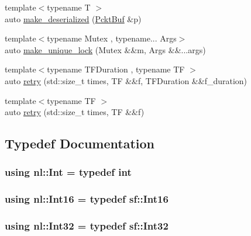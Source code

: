 \begin{DoxyCompactItemize}
\item 
{\footnotesize template$<$typename T $>$ }\\auto \hyperlink{namespacenl_ab637efa6cdc8acaf0cb94e7289636396}{make\+\_\+deserialized} (\hyperlink{namespacenl_a789b828a23e37a113433c2838e7c8e28}{Pckt\+Buf} \&p)
\item 
{\footnotesize template$<$typename Mutex , typename... Args$>$ }\\auto \hyperlink{namespacenl_a05d520ad247d87272efbbfcf19fed030}{make\+\_\+unique\+\_\+lock} (Mutex \&\&m, Args \&\&...args)
\item 
{\footnotesize template$<$typename T\+F\+Duration , typename T\+F $>$ }\\auto \hyperlink{namespacenl_a71c4160ecd923771c11be39eefbc6cdf}{retry} (std\+::size\+\_\+t times, T\+F \&\&f, T\+F\+Duration \&\&f\+\_\+duration)
\item 
{\footnotesize template$<$typename T\+F $>$ }\\auto \hyperlink{namespacenl_ac015cb5dadeafa94c1131849d44eb8ef}{retry} (std\+::size\+\_\+t times, T\+F \&\&f)
\end{DoxyCompactItemize}


\subsection{Typedef Documentation}
\hypertarget{namespacenl_a75e874e6d5b06878d52c27dd3082624f}{}
\subsubsection[{Int}]{\setlength{\rightskip}{0pt plus 5cm}using {\bf nl\+::\+Int} = typedef int}\label{namespacenl_a75e874e6d5b06878d52c27dd3082624f}
\hypertarget{namespacenl_a0da4be5ca70238b528bcaf2fb7d460c3}{}
\subsubsection[{Int16}]{\setlength{\rightskip}{0pt plus 5cm}using {\bf nl\+::\+Int16} = typedef sf\+::\+Int16}\label{namespacenl_a0da4be5ca70238b528bcaf2fb7d460c3}
\hypertarget{namespacenl_a92286b51ec22e31b1e1d2dffa2f594c1}{}
\subsubsection[{Int32}]{\setlength{\rightskip}{0pt plus 5cm}using {\bf nl\+::\+Int32} = typedef sf\+::\+Int32}\label{namespacenl_a92286b51ec22e31b1e1d2dffa2f594c1}
\hypertarget{namespacenl_af32eb9f8fa8a9a1f7079ca2c01c7ceb9}{}
